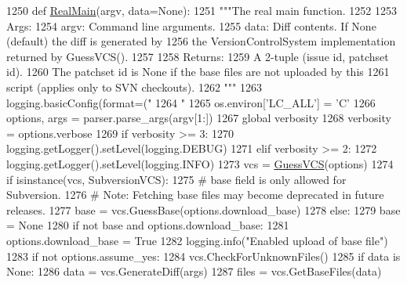 \begin{DoxyCode}
1250 \textcolor{keyword}{def }\hyperlink{namespaceupload_ad6226af96c9f1905602b8002bd5de952}{RealMain}(argv, data=None):
1251   \textcolor{stringliteral}{"""The real main function.}
1252 \textcolor{stringliteral}{}
1253 \textcolor{stringliteral}{  Args:}
1254 \textcolor{stringliteral}{    argv: Command line arguments.}
1255 \textcolor{stringliteral}{    data: Diff contents. If None (default) the diff is generated by}
1256 \textcolor{stringliteral}{      the VersionControlSystem implementation returned by GuessVCS().}
1257 \textcolor{stringliteral}{}
1258 \textcolor{stringliteral}{  Returns:}
1259 \textcolor{stringliteral}{    A 2-tuple (issue id, patchset id).}
1260 \textcolor{stringliteral}{    The patchset id is None if the base files are not uploaded by this}
1261 \textcolor{stringliteral}{    script (applies only to SVN checkouts).}
1262 \textcolor{stringliteral}{  """}
1263   logging.basicConfig(format=(\textcolor{stringliteral}{"%
1264                               \textcolor{stringliteral}{"%
1265   os.environ[\textcolor{stringliteral}{'LC\_ALL'}] = \textcolor{stringliteral}{'C'}
1266   options, args = parser.parse\_args(argv[1:])
1267   \textcolor{keyword}{global} verbosity
1268   verbosity = options.verbose
1269   \textcolor{keywordflow}{if} verbosity >= 3:
1270     logging.getLogger().setLevel(logging.DEBUG)
1271   \textcolor{keywordflow}{elif} verbosity >= 2:
1272     logging.getLogger().setLevel(logging.INFO)
1273   vcs = \hyperlink{namespaceupload_a31390568253accd22ee51861eaeb99bd}{GuessVCS}(options)
1274   \textcolor{keywordflow}{if} isinstance(vcs, SubversionVCS):
1275     \textcolor{comment}{# base field is only allowed for Subversion.}
1276     \textcolor{comment}{# Note: Fetching base files may become deprecated in future releases.}
1277     base = vcs.GuessBase(options.download\_base)
1278   \textcolor{keywordflow}{else}:
1279     base = \textcolor{keywordtype}{None}
1280   \textcolor{keywordflow}{if} \textcolor{keywordflow}{not} base \textcolor{keywordflow}{and} options.download\_base:
1281     options.download\_base = \textcolor{keyword}{True}
1282     logging.info(\textcolor{stringliteral}{"Enabled upload of base file"})
1283   \textcolor{keywordflow}{if} \textcolor{keywordflow}{not} options.assume\_yes:
1284     vcs.CheckForUnknownFiles()
1285   \textcolor{keywordflow}{if} data \textcolor{keywordflow}{is} \textcolor{keywordtype}{None}:
1286     data = vcs.GenerateDiff(args)
1287   files = vcs.GetBaseFiles(data)
}}
\end{DoxyCode}
